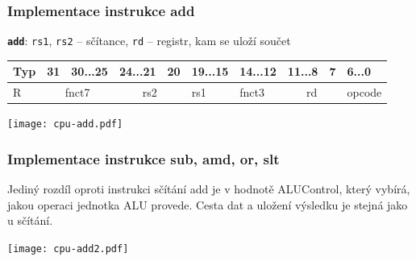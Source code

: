 \documentclass{beamer}
\begin{document}
\begin{frame}[shrink=25]
\frametitle{Implementace instrukce add}

\textbf{\texttt{add}}: \texttt{rs1}, \texttt{rs2} -- sčítance, \texttt{rd} -- registr, kam se uloží součet

\bigskip

\begin{table}
\footnotesize
\begin{tabular}{|m{0.4cm}|m{0.4cm}|m{1.0cm}|m{1.0cm}|m{0.4cm}|m{1.0cm}|m{1.0cm}|m{1.0cm}|m{0.4cm}|m{1.0cm}|}\hline
Typ & 31 & 30...25 & 24...21 & 20 & 19...15 & 14...12 & 11...8 & 7 & 6...0 \\ \hline
R & \multicolumn{2}{c|}{ fnct7 } & \multicolumn{2}{c|}{ rs2 } & rs1 & fnct3 &\multicolumn{2}{c|}{ rd } & opcode\\ \hline
\end{tabular}
\end{table}

\bigskip

\texttt{[image: cpu-add.pdf]}

\end{frame}


\begin{frame}
\frametitle{Implementace instrukce sub, amd, or, slt}

Jediný rozdíl oproti instrukci sčítání add je v hodnotě ALUControl, který vybírá, jakou operaci jednotka ALU provede. Cesta dat a uložení výsledku je stejná jako u sčítání.
\bigskip

\bigskip

\texttt{[image: cpu-add2.pdf]}

\end{frame}
\end{document}
